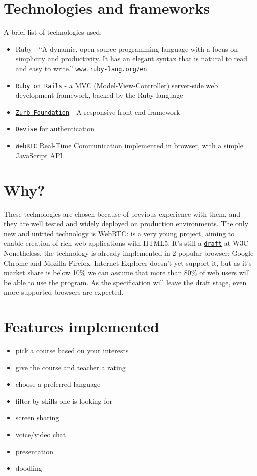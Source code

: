 \section{Technologies and frameworks}
A brief list of technologies used:
\begin{itemize}
    \item Ruby - ``A dynamic, open source programming language with a focus on
        simplicity and productivity.
        It has an elegant syntax that is natural to read and easy to write.''
        \href{https://wwww.ruby-lang.org/en/}{\texttt{www.ruby-lang.org/en}}
    \item \href{http://rubyonrails.org}{\texttt{Ruby on Rails}} - a MVC
        (Model-View-Controller) server-side web development framework, backed by
        the Ruby language
    \item \href{http://foundation.zurb.com/}{\texttt{Zurb Foundation}} - A
        responsive front-end framework
    \item \href{https://github.com/plataformatec/devise}{\texttt{Devise}} for
        authentication
    \item \href{http://www.webrtc.org/}{\texttt{WebRTC}} Real-Time Communication
        implemented in browser, with a simple JavaScript API
\end{itemize}

\section{Why?}
These technologies are chosen because of previous experience with them, and they
are well tested and widely deployed on production environments.
The only new and untried technology is WebRTC: is a very young project, aiming
to enable creation of rich web applications with HTML5. It's still a
\href{http://dev.w3.org/2011/webrtc/editor/webrtc.html}{\texttt{draft}} at W3C
Nonetheless, the technology is already implemented in 2 popular browser: Google
Chrome and Mozilla Firefox.  Internet Explorer doesn't yet support it, but as
it's market share is below 10\% we can assume that more than 80\% of web users
\citep{browserStats} will be able to use the program. As the specification will
leave the draft stage, even more supported browsers are expected.

\section{Features implemented}
\begin{itemize}
    \item pick a course based on your interests
    \item give the course and teacher a rating
    \item choose a preferred language
    \item filter by skills one is looking for
    \item screen sharing
    \item voice/video chat
    \item presentation
    \item doodling
\end{itemize}

